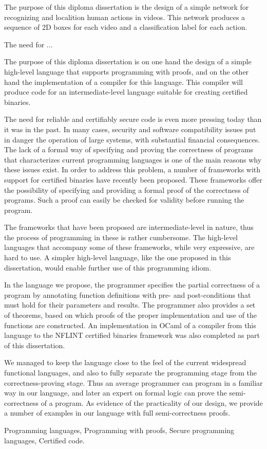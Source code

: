 \documentclass[diploma]{softlab-thesis}
\begin{document}
\begin{abstracten}%
  The purpose of this diploma dissertation is the design of a simple
  network for recognizing and localition human actions in videos.
  This network produces a sequence of 2D boxes for each video and
  a classification label for each action. 

  The need for ...

  
  The purpose of this diploma dissertation is on one hand the design
  of a simple high-level language that supports programming with
  proofs, and on the other hand the implementation of a compiler for
  this language. This compiler will produce code for an
  intermediate-level language suitable for creating certified
  binaries.

  The need for reliable and certifiably secure code is even more
  pressing today than it was in the past. In many cases, security and
  software compatibility issues put in danger the operation of large
  systems, with substantial financial consequences. The lack of a
  formal way of specifying and proving the correctness of programs that
  characterizes current programming languages is one of the main reasons
  why these issues exist. In order to address this problem, a number of
  frameworks with support for certified binaries have recently been
  proposed. These frameworks offer the possibility of specifying and
  providing a formal proof of the correctness of programs. Such a proof
  can easily be checked for validity before running the program.

  The frameworks that have been proposed are intermediate-level in
  nature, thus the process of programming in these is rather cumbersome.
  The high-level languages that accompany some of these frameworks,
  while very expressive, are hard to use. A simpler high-level language,
  like the one proposed in this dissertation, would enable further use
  of this programming idiom.

  In the language we propose, the programmer specifies the partial
  correctness of a program by annotating function definitions with pre-
  and post-conditions that must hold for their parameters and results.
  The programmer also provides a set of theorems, based on which proofs
  of the proper implementation and use of the functions are constructed.
  An implementation in OCaml of a compiler from this language to the
  NFLINT certified binaries framework was also completed as part of this
  dissertation.

  We managed to keep the language close to the feel of the current
  widespread functional languages, and also to fully separate the
  programming stage from the correctness-proving stage. Thus an average
  programmer can program in a familiar way in our language, and later an
  expert on formal logic can prove the semi-correctness of a program.
  As evidence of the practicality of our design, we provide a number of
  examples in our language with full semi-correctness proofs.
\begin{keywordsen}
Programming languages, Programming with proofs, Secure programming
languages, Certified code.
\end{keywordsen}
\end{abstracten}
\end{document}
